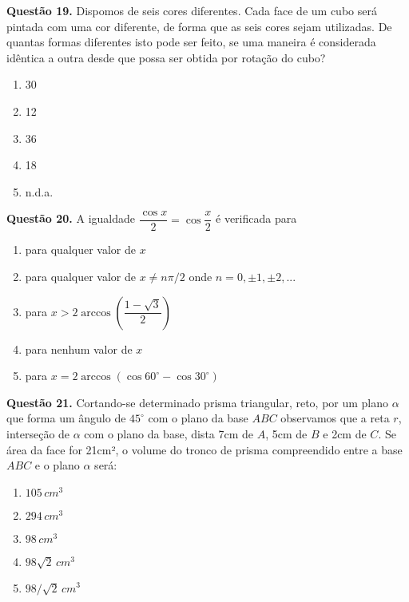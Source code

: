 \documentclass[11pt]{article}
\begin{document}
\textbf{Questão 19.} Dispomos de seis cores diferentes. Cada face de um cubo será pintada com uma cor diferente, de forma que as seis cores sejam utilizadas. De quantas formas diferentes isto pode ser feito, se uma maneira é considerada idêntica a outra desde que possa ser obtida por rotação do cubo?

\begin{multicols}{3}
    \begin{enumerate}[\bf A (\quad)]
        \item 30
        \item 12
        \item 36
        \item 18
        \item n.d.a.
    \end{enumerate}
\end{multicols}

\textbf{Questão 20.} A igualdade $\dfrac{\cos x}{2} = \cos \dfrac{x}{2}$ é verificada para

\begin{enumerate}[\bf A (\quad)]
    \item para qualquer valor de $x$
    \item para qualquer valor de $x \neq n \pi / 2$ onde $n = 0, \pm 1, \pm 2, ...$
    \item para $x > 2 \arccos \left( \dfrac{1 - \sqrt{3}}{2} \right)$
    \item para nenhum valor de $x$
    \item para $x = 2\arccos ( \cos 60^{\circ} - \cos 30^{\circ})$
\end{enumerate}

\textbf{Questão 21.} Cortando-se determinado prisma triangular, reto, por um plano $\alpha$ que forma um ângulo de $45^{\circ}$ com o plano da base $ABC$ observamos que a reta $r$, interseção de $\alpha$ com o plano da base, dista 7cm de $A$, 5cm de $B$ e 2cm de $C$. Se área da face for 21cm², o volume do tronco  de prisma compreendido entre a base $ABC$ e o plano $\alpha$ será:

\begin{multicols}{3}
    \begin{enumerate}[\bf A (\quad)]
        \item $105 \, cm^3$
        \item $294 \, cm^3$
        \item $98 \, cm^3$
        \item $98 \sqrt{2} \, cm^3$
        \item $98 /\sqrt{2} \, cm^3$
    \end{enumerate}
\end{multicols}
\end{document}
